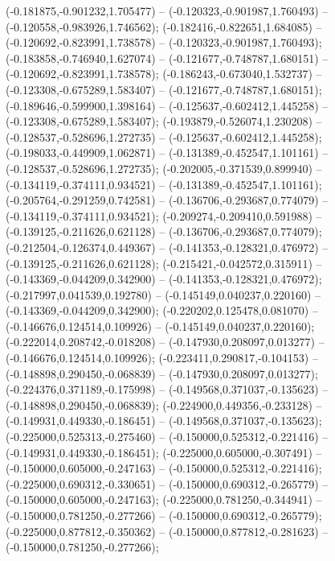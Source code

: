  (-0.181875,-0.901232,1.705477) -- (-0.120323,-0.901987,1.760493) -- (-0.120558,-0.983926,1.746562);
 (-0.182416,-0.822651,1.684085) -- (-0.120692,-0.823991,1.738578) -- (-0.120323,-0.901987,1.760493);
 (-0.183858,-0.746940,1.627074) -- (-0.121677,-0.748787,1.680151) -- (-0.120692,-0.823991,1.738578);
 (-0.186243,-0.673040,1.532737) -- (-0.123308,-0.675289,1.583407) -- (-0.121677,-0.748787,1.680151);
 (-0.189646,-0.599900,1.398164) -- (-0.125637,-0.602412,1.445258) -- (-0.123308,-0.675289,1.583407);
 (-0.193879,-0.526074,1.230208) -- (-0.128537,-0.528696,1.272735) -- (-0.125637,-0.602412,1.445258);
 (-0.198033,-0.449909,1.062871) -- (-0.131389,-0.452547,1.101161) -- (-0.128537,-0.528696,1.272735);
 (-0.202005,-0.371539,0.899940) -- (-0.134119,-0.374111,0.934521) -- (-0.131389,-0.452547,1.101161);
 (-0.205764,-0.291259,0.742581) -- (-0.136706,-0.293687,0.774079) -- (-0.134119,-0.374111,0.934521);
 (-0.209274,-0.209410,0.591988) -- (-0.139125,-0.211626,0.621128) -- (-0.136706,-0.293687,0.774079);
 (-0.212504,-0.126374,0.449367) -- (-0.141353,-0.128321,0.476972) -- (-0.139125,-0.211626,0.621128);
 (-0.215421,-0.042572,0.315911) -- (-0.143369,-0.044209,0.342900) -- (-0.141353,-0.128321,0.476972);
 (-0.217997,0.041539,0.192780) -- (-0.145149,0.040237,0.220160) -- (-0.143369,-0.044209,0.342900);
 (-0.220202,0.125478,0.081070) -- (-0.146676,0.124514,0.109926) -- (-0.145149,0.040237,0.220160);
 (-0.222014,0.208742,-0.018208) -- (-0.147930,0.208097,0.013277) -- (-0.146676,0.124514,0.109926);
 (-0.223411,0.290817,-0.104153) -- (-0.148898,0.290450,-0.068839) -- (-0.147930,0.208097,0.013277);
 (-0.224376,0.371189,-0.175998) -- (-0.149568,0.371037,-0.135623) -- (-0.148898,0.290450,-0.068839);
 (-0.224900,0.449356,-0.233128) -- (-0.149931,0.449330,-0.186451) -- (-0.149568,0.371037,-0.135623);
 (-0.225000,0.525313,-0.275460) -- (-0.150000,0.525312,-0.221416) -- (-0.149931,0.449330,-0.186451);
 (-0.225000,0.605000,-0.307491) -- (-0.150000,0.605000,-0.247163) -- (-0.150000,0.525312,-0.221416);
 (-0.225000,0.690312,-0.330651) -- (-0.150000,0.690312,-0.265779) -- (-0.150000,0.605000,-0.247163);
 (-0.225000,0.781250,-0.344941) -- (-0.150000,0.781250,-0.277266) -- (-0.150000,0.690312,-0.265779);
 (-0.225000,0.877812,-0.350362) -- (-0.150000,0.877812,-0.281623) -- (-0.150000,0.781250,-0.277266);
